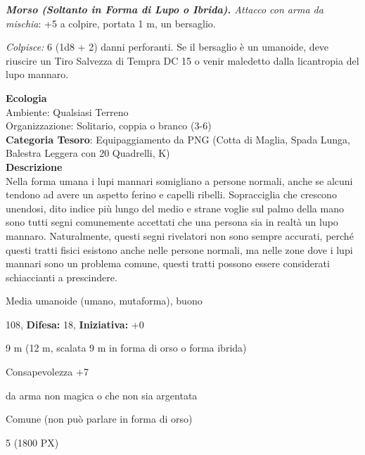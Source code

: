 \begin{multicols}{2}
{\emph{\textbf{Morso (Soltanto in Forma di Lupo o Ibrida).} Attacco con arma da mischia}: +5 a colpire, portata 1 m, un bersaglio.

\emph{Colpisce:} 6 (1d8 + 2) danni perforanti. Se il bersaglio è un umanoide, deve riuscire un Tiro Salvezza di Tempra DC 15 o venir maledetto dalla licantropia del lupo mannaro.

\textbf{Ecologia}\\
Ambiente: Qualsiasi Terreno\\
Organizzazione: Solitario, coppia o branco (3-6)\\
\textbf{Categoria Tesoro}: Equipaggiamento da PNG (Cotta di Maglia, Spada Lunga, Balestra Leggera con 20 Quadrelli, K)\\
\textbf{Descrizione}\\
Nella forma umana i lupi mannari somigliano a persone normali, anche se alcuni tendono ad avere un aspetto ferino e capelli ribelli. Sopracciglia che crescono unendosi, dito indice più lungo del medio e strane voglie sul palmo della mano sono tutti segni comunemente accettati che una persona sia in realtà un lupo mannaro. Naturalmente, questi segni rivelatori non sono sempre accurati, perché questi tratti fisici esistono anche nelle persone normali, ma nelle zone dove i lupi mannari sono un problema comune, questi tratti possono essere considerati schiaccianti a prescindere.

\noindent
\begin{description}[noitemsep, topsep=0pt, parsep=0pt, partopsep=0pt, leftmargin=0cm, labelwidth=2.2cm]
	\item[\textbf{Taglia/Tipo:}] Media umanoide (umano, mutaforma), buono
	\item[\textbf{Caratt.:}] 
	\item[\textbf{Punti Ferita:}] 108,  \textbf{Difesa:} 18,  \textbf{Iniziativa:} +0
	\item[\textbf{Movimento:}] 9 m (12 m, scalata 9 m in forma di orso o forma ibrida)
	\item[\textbf{Tiri Salvez.:}] 
	\item[\textbf{Comp.:}] Consapevolezza +7
	\item[\textbf{Imm. Danni:}] da arma non magica o che non sia argentata
	\item[\textbf{Linguaggi:}] Comune (non può parlare in forma di orso)
	\item[\textbf{Sfida:}] 5 (1800 PX)\smallskip
\end{description}

}
\end{multicols}
